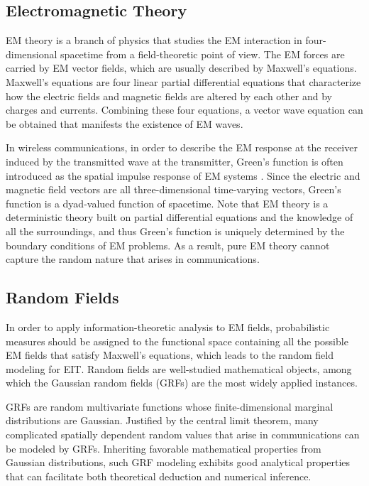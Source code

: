 \documentclass[journal,twocolumn]{IEEEtran}
\begin{document}
\subsection{Electromagnetic Theory}
\label{Sec_2_Subsec_3}
EM theory is a branch of physics that studies the EM interaction in four-dimensional spacetime from a field-theoretic point of view. The EM forces are carried by EM vector fields, which are usually described by Maxwell's equations. Maxwell's equations are four linear partial differential equations that characterize how the electric fields and magnetic fields are altered by each other and by charges and currents. Combining these four equations, a vector wave equation can be obtained that manifests the existence of EM waves. 

In wireless communications, in order to describe the EM response at the receiver induced by the transmitted wave at the transmitter, Green's function is often introduced as the spatial impulse response of EM systems \cite{stratton2007electromagnetic}. Since the electric and magnetic field vectors are all three-dimensional time-varying vectors, Green's function is a dyad-valued function of spacetime. 
Note that EM theory is a deterministic theory built on partial differential equations and the knowledge of all the surroundings, and thus Green's function is uniquely determined by the boundary conditions of EM problems.
As a result, pure EM theory cannot capture the random nature that arises in communications. 

\subsection{Random Fields}
\label{Sec_2_Subsec_4}
In order to apply information-theoretic analysis to EM fields, probabilistic measures should be assigned to the functional space containing all the possible EM fields that satisfy Maxwell's equations, which leads to the random field modeling for EIT. 
Random fields are well-studied mathematical objects, among which the Gaussian random fields (GRFs) are the most widely applied instances. 

GRFs are random multivariate functions whose finite-dimensional marginal distributions are Gaussian. Justified by the central limit theorem, many complicated spatially dependent random values that arise in communications can be modeled by GRFs.  
Inheriting favorable mathematical properties from Gaussian distributions, such GRF modeling exhibits good analytical properties that can facilitate both theoretical deduction and numerical inference. 
\end{document}
